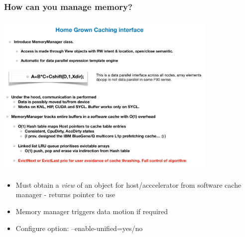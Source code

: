 \documentclass[pdf,ps,8pt]{beamer}
\begin{document}
\begin{frame}[fragile]\small\frametitle{ How can you manage memory?}
  \includegraphics[width=0.8\textwidth]{Caching.pdf}

  \begin{center}
    \begin{itemize}
    \begin{itemize}
    \item Must obtain a \emph{view} of an object for host/acccelerator from software cache manager - returns pointer to use
    \item Memory manager triggers data motion if required
    \item Configure option: --enable-unified=yes/no
    \end{itemize}
    \end{itemize}
  \end{center}
\end{frame}
\end{document}
